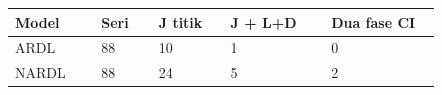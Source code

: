 {\small\setlength{\tabcolsep}{3pt}\renewcommand{\arraystretch}{1.15}
\begin{tabular}{p{0.18\linewidth}p{0.12\linewidth}p{0.15\linewidth}p{0.21\linewidth}p{0.23\linewidth}}
\toprule
\textbf{Model} & \textbf{Seri} & \textbf{J titik} & \textbf{J + L+D} & \textbf{Dua fase CI}\\
\midrule
ARDL & 88 & 10 & 1 & 0\\
NARDL & 88 & 24 & 5 & 2\\
\bottomrule
\end{tabular}
}